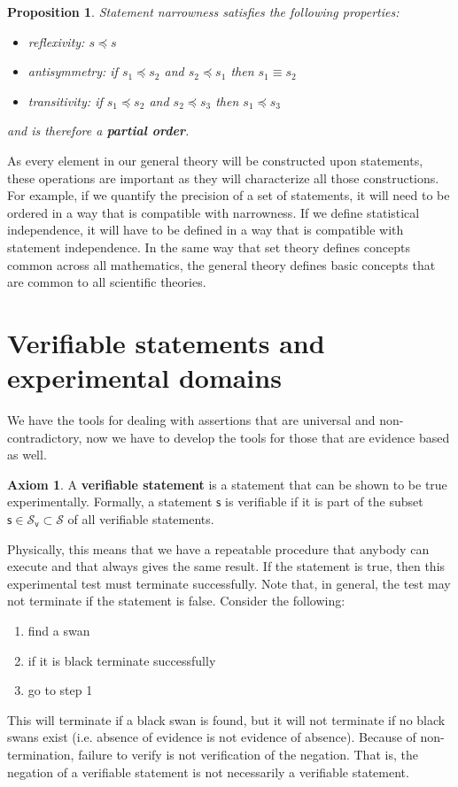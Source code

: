 \documentclass[letterpaper]{article}
\theoremstyle{plain}%
\newtheorem{prop}[thrm]{Proposition}
\theoremstyle{definition}
\newtheorem{axiom}[thrm]{Axiom}
\theoremstyle{remark}
\numberwithin{equation}{section}
\def\stmtSet{\mathcal{S}}
\def\vstmtSet{\mathcal{S}_\textsf{v}}
\def\narrower{\preccurlyeq}
\newcommand{\stmt}[1][s] {\mathsf{#1}}
\begin{document}
\begin{prop}
	Statement narrowness satisfies the following properties:
	\begin{itemize}
		\item reflexivity: $s \narrower s$
		\item antisymmetry: if $s_1 \narrower s_2$ and  $s_2 \narrower s_1$ then $s_1 \equiv s_2$
		\item transitivity: if $s_1 \narrower s_2$ and $s_2 \narrower s_3$ then $s_1 \narrower s_3$
	\end{itemize}
	and is therefore a \textbf{partial order}.
\end{prop}

As every element in our general theory will be constructed upon statements, these operations are important as they will characterize all those constructions. For example, if we quantify the precision of a set of statements, it will need to be ordered in a way that is compatible with narrowness. If we define statistical independence, it will have to be defined in a way that is compatible with statement independence. In the same way that set theory defines concepts common across all mathematics, the general theory defines basic concepts that are common to all scientific theories.

\section{Verifiable statements and experimental domains}

We have the tools for dealing with assertions that are universal and non-contradictory, now we have to develop the tools for those that are evidence based as well.

\begin{axiom}\label{ax_verifiable_statements}
	A \textbf{verifiable statement} is a statement that can be shown to be true experimentally. Formally, a statement $\stmt$ is verifiable if it is part of the subset $\stmt \in \vstmtSet \subset \stmtSet$ of all verifiable statements.
\end{axiom}

Physically, this means that we have a repeatable procedure that anybody can execute and that always gives the same result. If the statement is true, then this experimental test must terminate successfully. Note that, in general, the test may not terminate if the statement is false. Consider the following:
\begin{enumerate}
	\item find a swan
	\item if it is black terminate successfully
	\item go to step 1
\end{enumerate}
This will terminate if a black swan is found, but it will not terminate if no black swans exist (i.e. absence of evidence is not evidence of absence). Because of non-termination, failure to verify is not verification of the negation. That is, the negation of a verifiable statement is not necessarily a verifiable statement.
\end{document}

